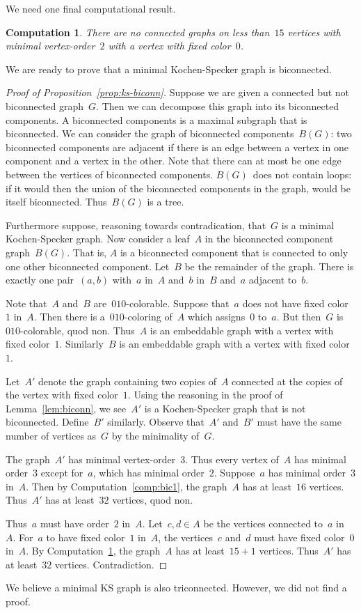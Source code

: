 \documentclass[adraft,copyright,creativecommons]{eptcs}
\newcounter{main}
\newtheorem{comp}[main]{Computation}
\theoremstyle{definition}
\theoremstyle{remark}
\begin{document}
We need one final computational result.
\begin{comp}\label{comp:bic2}
There are no connected graphs
on less than~$15$ vertices
with minimal vertex-order~$2$
with a vertex with fixed color~$0$. 
\end{comp}
We are ready to prove that a minimal Kochen-Specker graph
is biconnected.
\begin{proof}[Proof of Proposition~\ref{prop:ks-biconn}]
Suppose we are given a connected but not biconnected graph~$G$.
Then we can decompose
this graph into its biconnected components.  A biconnected components
is a maximal subgraph that is biconnected.
We can consider the graph of biconnected components~$B(G)$:
two biconnected components are adjacent if there is an edge
between a vertex in one component and a vertex in the other.
Note that there can at most be one edge between 
the vertices of biconnected components.
$B(G)$~does not contain loops: if it would
then the union of the biconnected components in the graph,
would be itself biconnected.  Thus~$B(G)$ is a tree.

Furthermore suppose, reasoning towards contradication,
that~$G$ is a minimal Kochen-Specker graph.
Now consider a leaf~$A$ in the biconnected component graph~$B(G)$.
That is, $A$ is a biconnected component that is connected to only
one other biconnected component.
Let~$B$ be the remainder of the graph.
There is exactly one pair~$(a,b)$ with~$a$ in~$A$ and~$b$ in~$B$
and~$a$ adjacent to~$b$.

Note that~$A$ and~$B$ are~$010$-colorable.
Suppose that~$a$ does not have fixed color~$1$ in~$A$.
Then there is a~$010$-coloring of~$A$
which assigns~$0$ to~$a$.
But then~$G$ is~$010$-colorable, quod non.
Thus~$A$ is an embeddable graph with a vertex with fixed color~$1$.
Similarly~$B$ is an embeddable graph with a vertex with fixed color~$1$.

Let~$A'$ denote the graph containing two copies of~$A$
connected at the copies of the vertex with fixed color~$1$.
Using the reasoning in the proof of Lemma~\ref{lem:biconn},
we see~$A'$ is a Kochen-Specker graph that is not biconnected.
Define~$B'$ similarly. Observe that~$A'$ and~$B'$ must have the same
number of vertices as~$G$ by the minimality of~$G$.

The graph~$A'$ has minimal vertex-order~$3$.
Thus every vertex of~$A$ has minimal order~$3$ except for~$a$,
which has minimal order~$2$.
Suppose~$a$ has minimal order~$3$ in~$A$.
Then by Computation~\ref{comp:bic1},
the graph~$A$ has at least~$16$ vertices.
Thus~$A'$ has at least~$32$ vertices, quod non.

Thus~$a$ must have order~$2$ in~$A$.
Let~$c,d \in A$ be the vertices connected to~$a$ in~$A$.
For~$a$ to have fixed color~$1$ in~$A$,
the vertices~$c$ and~$d$ must have fixed color~$0$ in~$A$.
By Computation~\ref{comp:bic2},
the graph~$A$ has at least~$15+1$ vertices.
Thus~$A'$ has at least~$32$ vertices. Contradiction.
\end{proof}
We believe a minimal KS graph is also triconnected.
However, we did not find a proof.
\end{document}
